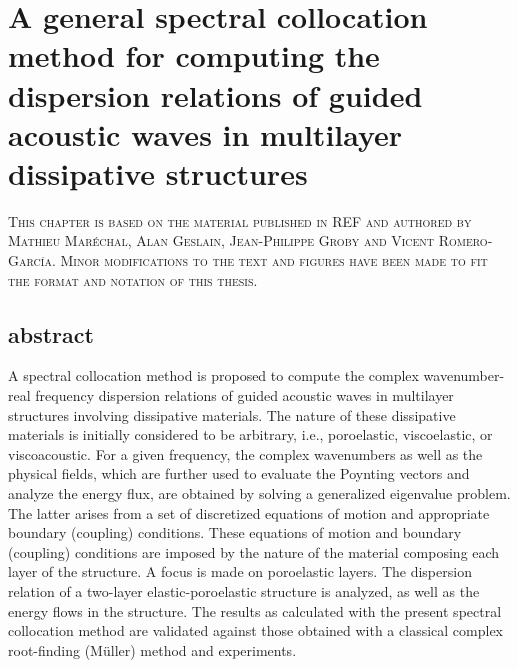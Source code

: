 \chapter{A general spectral collocation method for computing the dispersion relations of guided acoustic waves in multilayer dissipative structures}

\begin{center}
    {\color{gray}\textsc{This chapter is based on the material published in REF and authored by Mathieu Maréchal, Alan Geslain, Jean-Philippe Groby and Vicent Romero-Garc\'ia. Minor modifications to the text and figures have been made to fit the format and notation of this thesis.}}
\end{center}

\section{abstract}
A spectral collocation method is proposed to compute the complex wavenumber-real frequency dispersion relations of guided acoustic waves in multilayer structures involving dissipative materials. The nature of these dissipative materials is initially considered to be arbitrary, i.e., poroelastic, viscoelastic, or viscoacoustic. For a given frequency, the complex wavenumbers as well as the physical fields, which are further used to evaluate the Poynting vectors and analyze the energy flux, are obtained by solving a generalized eigenvalue problem. The latter arises from a set of discretized equations of motion and appropriate boundary (coupling) conditions. These equations of motion and boundary (coupling) conditions are imposed by the nature of the material composing each layer of the structure. A focus is made on poroelastic layers. The dispersion relation of a two-layer elastic-poroelastic structure is analyzed, as well as the energy flows in the structure. The results as calculated with the present spectral collocation method are validated against those obtained with a classical complex root-finding (M\"uller) method and experiments.



